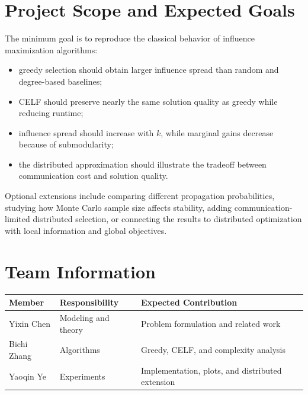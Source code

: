 \documentclass[10pt]{article}
\begin{document}
\section{Project Scope and Expected Goals}

The minimum goal is to reproduce the classical behavior of influence
maximization algorithms:
\begin{itemize}
    \item greedy selection should obtain larger influence spread than random
    and degree-based baselines;
    \item CELF should preserve nearly the same solution quality as greedy while
    reducing runtime;
    \item influence spread should increase with $k$, while marginal gains
    decrease because of submodularity;
    \item the distributed approximation should illustrate the tradeoff between
    communication cost and solution quality.
\end{itemize}

Optional extensions include comparing different propagation probabilities,
studying how Monte Carlo sample size affects stability, adding
communication-limited distributed selection, or connecting the results to
distributed optimization with local information and global objectives.

\section{Team Information}

\begin{tabular}{@{}lll@{}}
\toprule
Member & Responsibility & Expected Contribution \\
\midrule
Yixin Chen & Modeling and theory & Problem formulation and related work \\
Bichi Zhang & Algorithms & Greedy, CELF, and complexity analysis \\
Yaoqin Ye & Experiments & Implementation, plots, and distributed extension \\
\bottomrule
\end{tabular}
\end{document}
